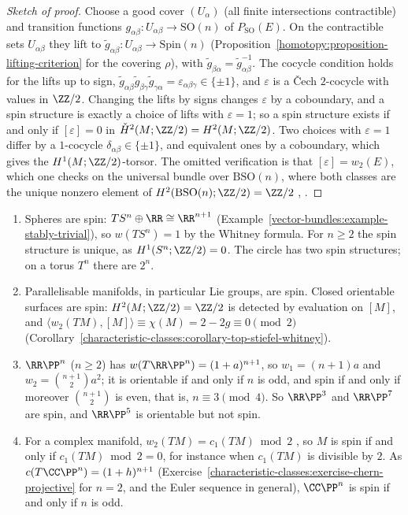 \begin{proof}[Sketch of proof]
Choose a good cover $(U_\alpha)$ (all finite intersections contractible) and transition functions $g_{\alpha\beta} \colon U_{\alpha\beta} \to \mathrm{SO}(n)$ of $P_{\mathrm{SO}}(E)$. On the contractible sets $U_{\alpha\beta}$ they lift
to $\tilde{g}_{\alpha\beta} \colon U_{\alpha\beta} \to \mathrm{Spin}(n)$ (Proposition~\ref{homotopy:proposition-lifting-criterion} for the covering $\rho$), with $\tilde{g}_{\beta\alpha} = \tilde{g}_{\alpha\beta}^{-1}$. The cocycle condition holds
for the lifts up to sign, $\tilde{g}_{\alpha\beta}\tilde{g}_{\beta\gamma}\tilde{g}_{\gamma\alpha} = \varepsilon_{\alpha\beta\gamma} \in \{\pm 1\}$, and $\varepsilon$ is a \v{C}ech $2$-cocycle with values in $\ZZ/2$. Changing the lifts by
signs changes $\varepsilon$ by a coboundary, and a spin structure is exactly a choice of lifts with $\varepsilon = 1$; so a spin structure exists if and only if $[\varepsilon] = 0$ in $\check{H}^2(M; \ZZ/2) = H^2(M; \ZZ/2)$. Two
choices with $\varepsilon = 1$ differ by a $1$-cocycle $\delta_{\alpha\beta} \in \{\pm 1\}$, and equivalent ones by a coboundary, which gives the $H^1(M; \ZZ/2)$-torsor. The omitted verification is that $[\varepsilon] = w_2(E)$, which
one checks on the universal bundle over $\mathrm{BSO}(n)$, where both classes are the unique nonzero element of $H^2(\mathrm{BSO}(n); \ZZ/2) = \ZZ/2$ \cite[Chapter II]{lawson-michelsohn}, \cite{milnor-spin-1963}.
\end{proof}

\begin{example}\label{spin-geometry:example-spin-manifolds}
\begin{enumerate}
\item Spheres are spin: $TS^n \oplus \RR \cong \RR^{n+1}$ (Example~\ref{vector-bundles:example-stably-trivial}), so $w(TS^n) = 1$ by the Whitney formula. For $n \geq 2$ the spin structure is unique, as $H^1(S^n; \ZZ/2) = 0$.
The circle has two spin structures; on a torus $T^n$ there are $2^n$.
\item Parallelisable manifolds, in particular Lie groups, are spin. Closed orientable surfaces are spin: $H^2(M; \ZZ/2) = \ZZ/2$ is detected by evaluation on $[M]$, and
$\langle w_2(TM), [M]\rangle \equiv \chi(M) = 2 - 2g \equiv 0 \pmod 2$ (Corollary~\ref{characteristic-classes:corollary-top-stiefel-whitney}).
\item $\RR\PP^n$ ($n \geq 2$) has $w(T\RR\PP^n) = (1 + a)^{n+1}$, so $w_1 = (n + 1)a$ and $w_2 = \binom{n+1}{2}a^2$; it is orientable if and only if $n$ is odd, and spin if and only if moreover $\binom{n+1}{2}$ is even, that is,
$n \equiv 3 \pmod 4$. So $\RR\PP^3$ and $\RR\PP^7$ are spin, and $\RR\PP^5$ is orientable but not spin.
\item For a complex manifold, $w_2(TM) = c_1(TM) \bmod 2$ \cite[Chapter 14]{milnor-stasheff}, so $M$ is spin if and only if $c_1(TM) \bmod 2 = 0$, for instance when $c_1(TM)$ is divisible by $2$. As $c(T\CC\PP^n) = (1 + h)^{n+1}$ (Exercise~\ref{characteristic-classes:exercise-chern-projective} for $n = 2$, and the Euler sequence in general), $\CC\PP^n$ is spin if and only if $n$ is odd.
\end{enumerate}
\end{example}

